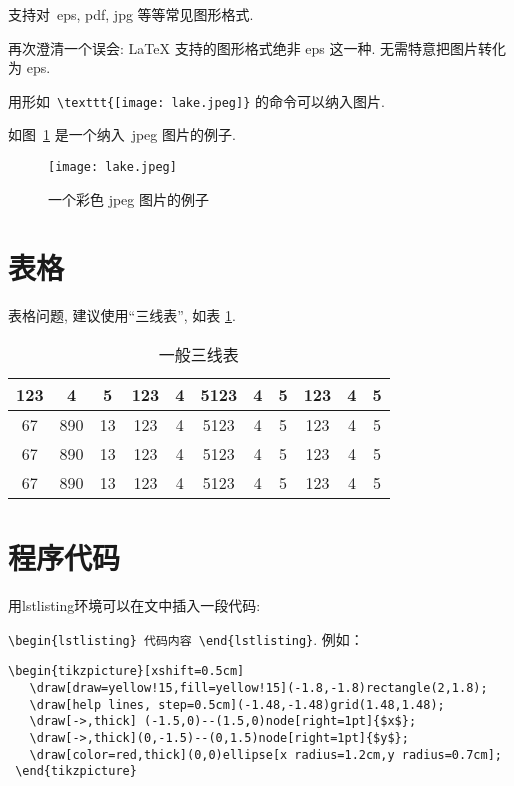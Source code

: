 支持对~eps, pdf, jpg 等等常见图形格式.

再次\colorbox{red!45}{澄清一个误会}: \LaTeX{} 支持的图形格式绝非 eps 这一种. 无需特意把图片转化为 eps.

用形如~\verb|\texttt{[image: lake.jpeg]}| 的命令可以纳入图片.

如图~\ref{fig:2} 是一个纳入~jpeg 图片的例子.

\begin{figure}[ht]
  \centering
  \texttt{[image: lake.jpeg]}
  \caption{一个彩色 jpeg 图片的例子}
  \label{fig:2}
\end{figure}

\section{表格}
表格问题, 建议使用``三线表'', 如表 \ref{tab:1}.

\begin{table}[ht]
  \centering
  \caption{一般三线表}
  \label{tab:1}
  \begin{tabular}{c c c c c c c c c c c}
    \toprule
    123 & 4   & 5  & 123 & 4 & 5123 & 4 & 5 & 123 & 4 & 5 \\
    \midrule
    67  & 890 & 13 & 123 & 4 & 5123 & 4 & 5 & 123 & 4 & 5 \\
    67  & 890 & 13 & 123 & 4 & 5123 & 4 & 5 & 123 & 4 & 5 \\
    67  & 890 & 13 & 123 & 4 & 5123 & 4 & 5 & 123 & 4 & 5 \\
    \bottomrule
  \end{tabular}
\end{table}

\section{程序代码}

用lstlisting环境可以在文中插入一段代码: \par
\verb|\begin{lstlisting} 代码内容 \end{lstlisting}|. 例如：

\begin{lstlisting}
\begin{tikzpicture}[xshift=0.5cm]
   \draw[draw=yellow!15,fill=yellow!15](-1.8,-1.8)rectangle(2,1.8);
   \draw[help lines, step=0.5cm](-1.48,-1.48)grid(1.48,1.48);
   \draw[->,thick] (-1.5,0)--(1.5,0)node[right=1pt]{$x$};
   \draw[->,thick](0,-1.5)--(0,1.5)node[right=1pt]{$y$};
   \draw[color=red,thick](0,0)ellipse[x radius=1.2cm,y radius=0.7cm];
 \end{tikzpicture}
 \end{lstlisting}


